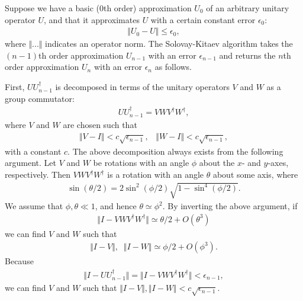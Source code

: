 Suppose we have a basic ($0$th order) approximation $U_0$ of an arbitrary unitary operator $U$, and that it approximates $U$ with a certain constant error $\epsilon _0$:
\begin{eqnarray}
\Vert  U_0 - U \Vert  \leq \epsilon _0,
\end{eqnarray}
where $\Vert  ...\Vert $ indicates an operator norm.
The Solovay-Kitaev algorithm takes the $(n-1)$th order approximation $U_{n-1}$ with an error $\epsilon _{n-1}$ and returns the $n$th order approximation $U_n$ with an error $\epsilon _n$ as follows.

First, $U U^{\dag}_{n-1}$ is decomposed in terms of the unitary operators $V$ and $W$ as a group commutator:
\begin{eqnarray}
U U_{n-1}^{\dag}= VWV^{\dag}W^{\dag} ,
\label{eq:BGC}
\end{eqnarray}
where $V$ and $W$ are chosen such that 
\begin{eqnarray}
\Vert  V - I \Vert  < c \sqrt{\epsilon _{n-1}}, \;\;\; \Vert  W - I \Vert  < c \sqrt{\epsilon _{n-1}},
\end{eqnarray}
with a constant $c$.
The above decomposition always exists from the following argument.
Let $V$ and $W$ be rotations with an angle $\phi$ about the $x$- and $y$-axes, respectively.
Then $VWV^{\dag}W^{\dag}$ is a rotation with an angle $\theta$ about some axis, where
\begin{eqnarray}
\sin (\theta /2) = 2 \sin ^2 (\phi /2) \sqrt{1-\sin ^4 (\phi /2)}.
\end{eqnarray}
We assume that $\phi , \theta \ll 1$, and hence $\theta \simeq \phi^2$.
By inverting the above argument, if
\begin{eqnarray}
\Vert  I- VWV^{\dag}W^{\dag} \Vert  \simeq \theta /2 + O(\theta ^3)
\end{eqnarray}
we can find $V$ and $W$ such that
\begin{eqnarray}
\Vert  I - V\Vert  ,\;\; \Vert  I-W \Vert  \simeq \phi/2 + O(\phi^3).
\end{eqnarray}
Because
\begin{eqnarray}
\Vert I -U U_{n-1}^{\dag} \Vert  = \Vert  I- VWV^{\dag}W^{\dag} \Vert < \epsilon _{n-1},
\end{eqnarray}
we can find $V$ and $W$ such that $\Vert  I -V\Vert , \Vert I-W\Vert  <c \sqrt{\epsilon _{n-1}}$.

